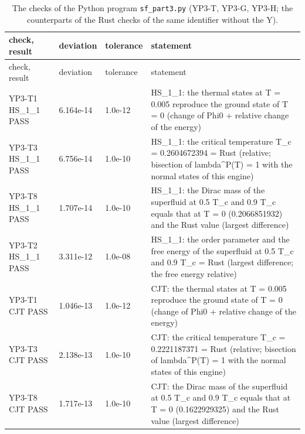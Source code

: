 \documentclass[aps,prd,onecolumn,superscriptaddress,nofootinbib,floatfix,longbibliography]{revtex4-2}
\begin{document}
\begingroup\fontsize{7}{8.5}\selectfont\setlength{\tabcolsep}{3pt}
\begin{longtable}{p{}p{}p{}p{}}
\caption{The checks of the Python program \texttt{sf\_part3.py} (YP3-T, YP3-G, YP3-H; the counterparts of the Rust checks of the same identifier without the Y).}\\
\hline\hline
check, result & deviation & tolerance & statement \\ \hline
\endfirsthead
\hline check, result & deviation & tolerance & statement \\ \hline
\endhead
\hline\hline
\endlastfoot
YP3-T1 HS\_1\_1 \newline PASS & 6.164e-14 & 1.0e-12 & HS\_1\_1: the thermal states at T = 0.005 reproduce the ground state of T = 0 (\textbar{}change of Phi0\textbar{} + relative change of the energy) \\
YP3-T3 HS\_1\_1 \newline PASS & 6.756e-14 & 1.0e-10 & HS\_1\_1: the critical temperature T\_c = 0.2604672394 = Rust (relative; bisection of lambda\textasciicircum{}P(T) = 1 with the normal states of this engine) \\
YP3-T8 HS\_1\_1 \newline PASS & 1.707e-14 & 1.0e-10 & HS\_1\_1: the Dirac mass of the superfluid at 0.5 T\_c and 0.9 T\_c equals that at T = 0 (0.2066851932) and the Rust value (largest difference) \\
YP3-T2 HS\_1\_1 \newline PASS & 3.311e-12 & 1.0e-08 & HS\_1\_1: the order parameter and the free energy of the superfluid at 0.5 T\_c and 0.9 T\_c = Rust (largest difference; the free energy relative) \\
YP3-T1 CJT \newline PASS & 1.046e-13 & 1.0e-12 & CJT: the thermal states at T = 0.005 reproduce the ground state of T = 0 (\textbar{}change of Phi0\textbar{} + relative change of the energy) \\
YP3-T3 CJT \newline PASS & 2.138e-13 & 1.0e-10 & CJT: the critical temperature T\_c = 0.2221187371 = Rust (relative; bisection of lambda\textasciicircum{}P(T) = 1 with the normal states of this engine) \\
YP3-T8 CJT \newline PASS & 1.717e-13 & 1.0e-10 & CJT: the Dirac mass of the superfluid at 0.5 T\_c and 0.9 T\_c equals that at T = 0 (0.1622929325) and the Rust value (largest difference) \\

\end{longtable}
\end{document}
